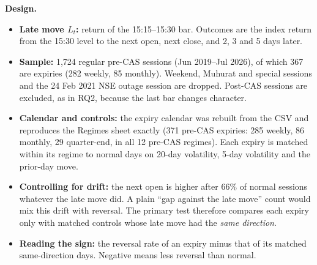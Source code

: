 \documentclass[10pt,a4paper]{article}
\begin{document}
\textbf{Design.}
\begin{itemize}
\item \textbf{Late move $L_t$:} return of the 15:15--15:30 bar. Outcomes are the index return from the 15:30 level to the next open, next close, and 2, 3 and 5 days later.
\item \textbf{Sample:} 1{,}724 regular pre-CAS sessions (Jun 2019--Jul 2026), of which 367 are expiries (282 weekly, 85 monthly). Weekend, Muhurat and special sessions and the 24 Feb 2021 NSE outage session are dropped. Post-CAS sessions are excluded, as in RQ2, because the last bar changes character.
\item \textbf{Calendar and controls:} the expiry calendar was rebuilt from the CSV and reproduces the Regimes sheet exactly (371 pre-CAS expiries: 285 weekly, 86 monthly, 29 quarter-end, in all 12 pre-CAS regimes). Each expiry is matched within its regime to normal days on 20-day volatility, 5-day volatility and the prior-day move.
\item \textbf{Controlling for drift:} the next open is higher after 66\% of normal sessions whatever the late move did. A plain ``gap against the late move'' count would mix this drift with reversal. The primary test therefore compares each expiry only with matched controls whose late move had the \emph{same direction}.
\item \textbf{Reading the sign:} the reversal rate of an expiry minus that of its matched same-direction days. Negative means less reversal than normal.
\end{itemize}
\end{document}
